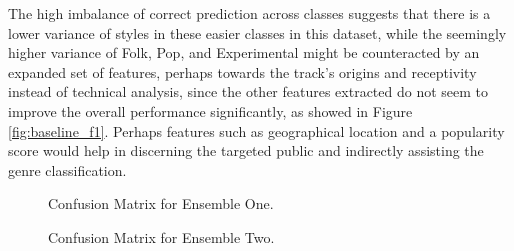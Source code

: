 The high imbalance of correct prediction across classes suggests that there is a lower variance of styles in these easier classes in this dataset, while the seemingly higher variance of Folk, Pop, and Experimental might be counteracted by an expanded set of features, perhaps towards the track's origins and receptivity instead of technical analysis, since the other features extracted do not seem to improve the overall performance significantly, as showed in Figure \ref{fig:baseline_f1}. Perhaps features such as geographical location and a popularity score would help in discerning the targeted public and indirectly assisting the genre classification.

\begin{figure*}
    \centering
    \begin{minipage}{0.48\textwidth}
        \centering
        
        \caption{Confusion Matrix for Ensemble One.}
        \label{fig:CM_E1-test}
    \end{minipage}
    \begin{minipage}{0.48\textwidth}
        \centering
        
        \caption{Confusion Matrix for Ensemble Two.}
        \label{fig:CM_E2-test}
    \end{minipage}
\end{figure*}
